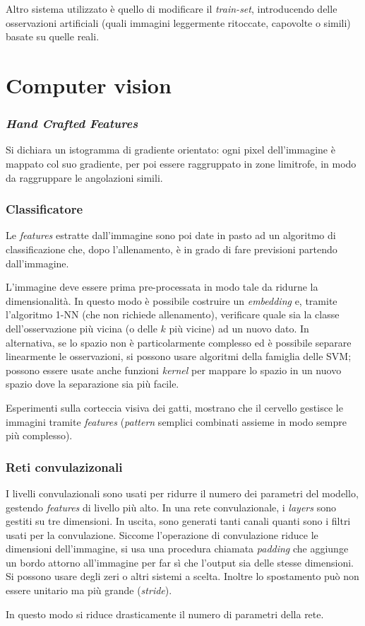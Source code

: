 \documentclass[11pt, a4page]{article}
\begin{document}
Altro sistema utilizzato è quello di modificare il \textit{train-set}, introducendo delle osservazioni artificiali (quali immagini leggermente ritoccate, capovolte o simili) basate su quelle reali.


\newpage
\part{Computer vision}

\section{\textit{Hand Crafted Features}}
Si dichiara un istogramma di gradiente orientato: ogni pixel dell'immagine è mappato col suo gradiente, per poi essere raggruppato in zone limitrofe, in modo da raggruppare le angolazioni simili.

\section{Classificatore}
Le \textit{features} estratte dall'immagine sono poi date in pasto ad un algoritmo di classificazione che, dopo l'allenamento, è in grado di fare previsioni partendo dall'immagine.

L'immagine deve essere prima pre-processata in modo tale da ridurne la dimensionalità.
In questo modo è possibile costruire un \textit{embedding} e, tramite l'algoritmo 1-NN (che non richiede allenamento), verificare quale sia la classe dell'osservazione più vicina (o delle $k$ più vicine) ad un nuovo dato.
In alternativa, se lo spazio non è particolarmente complesso ed è possibile separare linearmente le osservazioni, si possono usare algoritmi della famiglia delle SVM; possono essere usate anche funzioni \textit{kernel} per mappare lo spazio in un nuovo spazio dove la separazione sia più facile.

Esperimenti sulla corteccia visiva dei gatti, mostrano che il cervello gestisce le immagini tramite \textit{features} (\textit{pattern} semplici combinati assieme in modo sempre più complesso).

\section{Reti convulazizonali}
I livelli convulazionali sono usati per ridurre il numero dei parametri del modello, gestendo \textit{features} di livello più alto.
In una rete convulazionale, i \textit{layers} sono gestiti su tre dimensioni.
In uscita, sono generati tanti canali quanti sono i filtri usati per la convulazione.
Siccome l'operazione di convulazione riduce le dimensioni dell'immagine, si usa una procedura chiamata \textit{padding} che aggiunge un bordo attorno all'immagine per far sì che l'output sia delle stesse dimensioni.
Si possono usare degli zeri o altri sistemi a scelta.
Inoltre lo spostamento può non essere unitario ma più grande (\textit{stride}).

In questo modo si riduce drasticamente il numero di parametri della rete.
\end{document}
